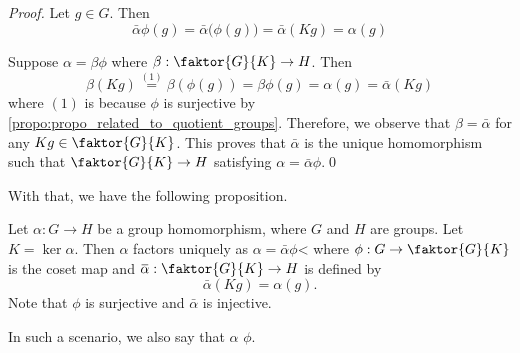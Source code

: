 \begin{proof}
  Let $g \in G$. Then
  \begin{equation*}
    \bar{\alpha} \phi (g) = \bar{\alpha} \big( \phi(g) \big) = \bar{\alpha} (Kg) = \alpha(g)
  \end{equation*}

  Suppose $\alpha = \beta \phi$ where $\beta : \faktor{G}{K} \to H$. Then
  \begin{equation*}
    \beta (Kg) \overset{(1)}{=} \beta ( \phi(g) ) = \beta \phi(g) = \alpha(g) = \bar{\alpha} (Kg)
  \end{equation*}
  where $(1)$ is because $\phi$ is surjective by \cref{propo:propo_related_to_quotient_groups}. Therefore, we observe that $\beta = \bar{\alpha}$ for any $Kg \in \faktor{G}{K}$. This proves that $\bar{\alpha}$ is the unique homomorphism such that $\faktor{G}{K} \to H$ satisfying $\alpha = \bar{\alpha} \phi$.\qed
\end{proof}

With that, we have the following proposition.

\begin{propo}
\label{propo:uniqueness_of_homomorphism_factors}
  Let $\alpha : G \to H$ be a group homomorphism, where $G$ and $H$ are groups. Let $K = \ker \alpha$. Then $\alpha$ factors uniquely as $\alpha = \bar{\alpha} \phi$< where $\phi : G \to \faktor{G}{K}$ is the coset map and $\bar{\alpha} : \faktor{G}{K} \to H$ is defined by
  \begin{equation*}
    \bar{\alpha} (Kg) = \alpha(g).
  \end{equation*}
  Note that $\phi$ is surjective and $\bar{\alpha}$ is injective.

  In such a scenario, we also say that $\alpha$  $\phi$.
\end{propo}

